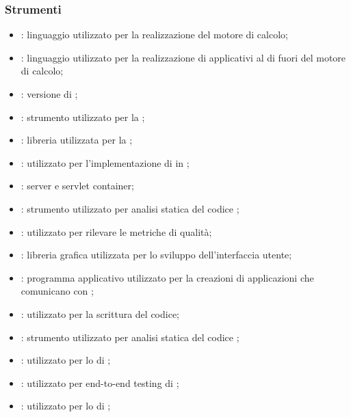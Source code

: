     \subsubsection{Strumenti}
    \begin{itemize}
        \item \textbf{}: linguaggio utilizzato per la realizzazione del motore di calcolo;
        \item \textbf{}: linguaggio utilizzato per la realizzazione di applicativi al di fuori del motore di calcolo;
        \item \textbf{}: versione  di ;
        \item \textbf{}: strumento utilizzato per la ;
        \item \textbf{}: libreria utilizzata per la ;
        \item \textbf{}:  utilizzato per l'implementazione di  in ;
        \item \textbf{}: server  e servlet container;
        \item \textbf{}: strumento utilizzato per analisi statica del codice ;
        \item \textbf{}: utilizzato per rilevare le metriche di qualità;
        \item \textbf{}: libreria grafica utilizzata per lo sviluppo dell'interfaccia utente;
        \item \textbf{}: programma applicativo utilizzato per la creazioni di applicazioni che comunicano con ;
        \item \textbf{}:  utilizzato per la scrittura del codice;
        \item \textbf{}: strumento utilizzato per analisi statica del codice ;
        \item \textbf{}:  utilizzato per lo  di ;
        \item \textbf{}:  utilizzato per end-to-end testing di ;
        \item \textbf{}:  utilizzato per lo  di ;

\end{itemize}

